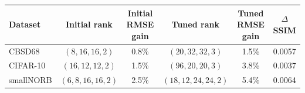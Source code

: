 \begin{tabular}{@{}l c c c c c@{}}
\toprule
Dataset & Initial rank & Initial RMSE gain & Tuned rank & Tuned RMSE gain & \(\Delta\)SSIM \\
\midrule
CBSD68 & \((8,16,16,2)\) & 0.8\% & \((20,32,32,3)\) & 1.5\% & 0.0057 \\
CIFAR-10 & \((16,12,12,2)\) & 1.5\% & \((96,20,20,3)\) & 3.8\% & 0.0037 \\
smallNORB & \((6,8,16,16,2)\) & 2.5\% & \((18,12,24,24,2)\) & 5.4\% & 0.0064 \\
\bottomrule
\end{tabular}
